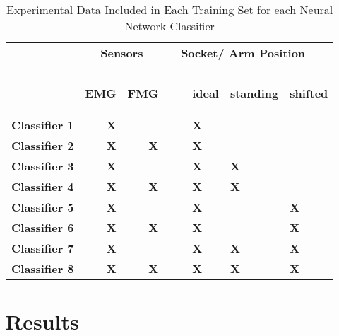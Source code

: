 \documentclass[twocolumn]{sagej}
\begin{document}
\begin{table}[htbp]
  \centering
   \caption{Experimental Data Included in Each Training Set for each Neural Network Classifier}
    \begin{tabular}{lrrrllll}
    \toprule
    \textbf{} & \multicolumn{2}{c}{\textbf{Sensors}} & \textbf{} & \multicolumn{4}{l}{\textbf{Socket/ Arm Position}} \\
    \\
    \\
    \textbf{} & \begin{rotate}{30}\textbf{EMG}\end{rotate}  & \begin{rotate}{30} \textbf{FMG}\end{rotate} & & \textbf{} & \begin{rotate}{30}\textbf{ideal}\end{rotate} &  \begin{rotate}{30}\textbf{standing}\end{rotate} & \begin{rotate}{30} \textbf{shifted} \end{rotate} \\
    \textbf{Classifier 1} & \textbf{X} & \textbf{} & & & \textbf{X} &  \textbf{} & \textbf{} \\
    \textbf{Classifier 2} & \textbf{X} & \textbf{X} & & & \textbf{X} & \textbf{} & \textbf{} \\
    \textbf{Classifier 3} & \textbf{X} & \textbf{} & & & \textbf{X} &  \textbf{X} & \textbf{} \\
    \textbf{Classifier 4} & \textbf{X} & \textbf{X} & & & \textbf{X} & \textbf{X} & \textbf{} \\
    \textbf{Classifier 5} & \textbf{X} & \textbf{} & & & \textbf{X} &  \textbf{} & \textbf{X} \\
    \textbf{Classifier 6} & \textbf{X} & \textbf{X} & & & \textbf{X} & \textbf{} & \textbf{X} \\
    \textbf{Classifier 7} & \textbf{X} & \textbf{} & & & \textbf{X} &  \textbf{X} & \textbf{X} \\
    \textbf{Classifier 8} & \textbf{X} & \textbf{X} & & & \textbf{X} & \textbf{X} & \textbf{X} \\
    \bottomrule
    \end{tabular}%
  \label{tab:groups}%
\end{table}%



\section*{Results}
\label{sec:results}
\end{document}
